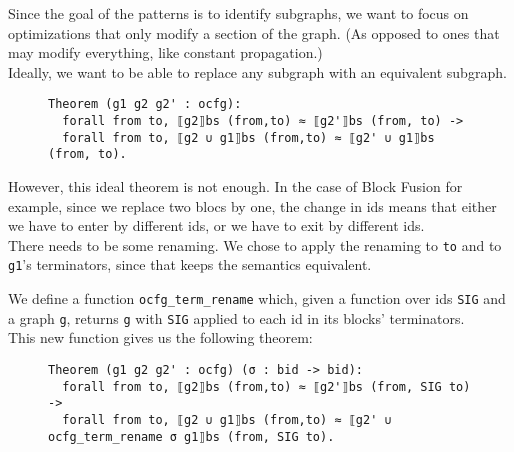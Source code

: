 \documentclass[11pt]{article}
\newcommand{\inlinecoq}[1]{\mbox{\lstinline[style=customcoq,columns=fixed,basewidth=.48em]{#1}}}
\newcommand{\ilc}[1]{\inlinecoq{#1}}
\begin{document}
Since the goal of the patterns is to identify subgraphs, we want to focus on optimizations that only modify a section of the graph. (As opposed to ones that may modify everything, like constant propagation.)\\
Ideally, we want to be able to replace any subgraph with an equivalent subgraph.

\begin{figure}
\end{figure}
\begin{figure}
  \begin{lstlisting}[style=customcoq,basicstyle=\small\ttfamily]
Theorem (g1 g2 g2' : ocfg):
  forall from to, ⟦g2⟧bs (from,to) ≈ ⟦g2'⟧bs (from, to) ->
  forall from to, ⟦g2 ∪ g1⟧bs (from,to) ≈ ⟦g2' ∪ g1⟧bs (from, to).
  \end{lstlisting}
\end{figure}

However, this ideal theorem is not enough. In the case of Block Fusion for example, since we replace two blocs by one, the change in ids means that either we have to enter by different ids, or we have to exit by different ids.\\
There needs to be some renaming. We chose to apply the renaming to \ilc{to} and to \ilc{g1}'s terminators, since that keeps the semantics equivalent.

We define a function \ilc{ocfg_term_rename} which, given a function over ids \ilc{SIG} and a graph \ilc{g}, returns \ilc{g} with \ilc{SIG} applied to each id in its blocks' terminators.\\
This new function gives us the following theorem:
\begin{figure}
  \begin{lstlisting}[style=customcoq,basicstyle=\small\ttfamily]
Theorem (g1 g2 g2' : ocfg) (σ : bid -> bid):
  forall from to, ⟦g2⟧bs (from,to) ≈ ⟦g2'⟧bs (from, SIG to) ->
  forall from to, ⟦g2 ∪ g1⟧bs (from,to) ≈ ⟦g2' ∪ ocfg_term_rename σ g1⟧bs (from, SIG to).
  \end{lstlisting}
\end{figure}
\end{document}
